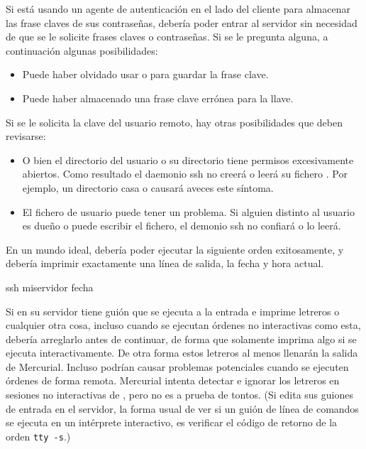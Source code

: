 Si está usando un agente de autenticación en el lado del cliente para
almacenar las frase claves de sus contraseñas, debería poder entrar al
servidor sin necesidad de que se le solicite frases claves o
contraseñas.  Si se le pregunta alguna, a continuación algunas
posibilidades:
\begin{itemize}
\item Puede haber olvidado usar  o
   para guardar la frase clave.
\item Puede haber almacenado una frase clave errónea para la llave.
\end{itemize}
Si se le solicita la clave del usuario remoto, hay otras posibilidades
que deben revisarse:
\begin{itemize}
\item O bien el directorio del usuario o su directorio 
  tiene permisos excesivamente abiertos.  Como resultado el daemonio
  ssh no creerá o leerá su fichero .  
  Por ejemplo, un directorio casa o  causará aveces
  este síntoma.
\item El fichero de usuario  puede tener
  un problema.  Si alguien distinto al usuario es dueño o puede
  escribir el fichero, el demonio ssh no confiará o lo leerá.
\end{itemize}

En un mundo ideal, debería poder ejecutar la siguiente orden
exitosamente, y debería imprimir exactamente una línea de salida,
la fecha y hora actual.
\begin{codesample2}
  ssh miservidor fecha
\end{codesample2}

Si en su servidor tiene guión que se ejecuta a la entrada e imprime
letreros o cualquier otra cosa, incluso cuando se ejecutan órdenes no
interactivas como esta, debería arreglarlo antes de continuar, de
forma que solamente imprima algo si se ejecuta interactivamente.  De
otra forma estos letreros al menos llenarán la salida de Mercurial. 
Incluso podrían causar problemas potenciales cuando se ejecuten
órdenes de forma remota.  Mercurial intenta detectar e ignorar los
letreros en sesiones no interactivas de , pero no es
a prueba de tontos.  (Si edita sus guiones de entrada en el servidor,
la forma usual de ver si un guión de línea de comandos se ejecuta en un intérprete
interactivo, es verificar el código de retorno de la orden
\Verb|tty -s|.)

